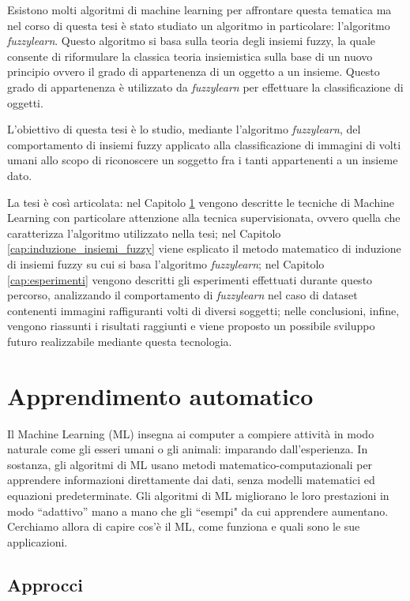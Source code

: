\documentclass[12pt,italian]{report}
\begin{document}
Esistono molti algoritmi di machine learning per affrontare questa tematica ma nel corso di questa tesi è stato studiato un algoritmo in particolare: l'algoritmo \emph{fuzzylearn}. Questo algoritmo si basa sulla teoria degli insiemi fuzzy, la quale consente di riformulare la classica teoria insiemistica sulla base di un nuovo principio ovvero il grado di appartenenza di un oggetto a un insieme. Questo grado di appartenenza è utilizzato da \emph{fuzzylearn} per effettuare la classificazione di oggetti.

L'obiettivo di questa tesi è lo studio, mediante l'algoritmo \emph{fuzzylearn}, del comportamento di insiemi fuzzy applicato alla classificazione di immagini di volti umani allo scopo di riconoscere un soggetto fra i tanti appartenenti a un insieme dato.

La tesi è così articolata: nel Capitolo \ref{cap:apprendimento_automatico} vengono descritte le tecniche di Machine Learning con particolare attenzione alla tecnica supervisionata, ovvero quella che caratterizza l'algoritmo utilizzato nella tesi; nel Capitolo \ref{cap:induzione_insiemi_fuzzy} viene esplicato il metodo matematico di induzione di insiemi fuzzy su cui si basa l'algoritmo \emph{fuzzylearn}; nel Capitolo \ref{cap:esperimenti} vengono descritti gli esperimenti effettuati durante questo percorso, analizzando il comportamento di \emph{fuzzylearn} nel caso di dataset contenenti immagini raffiguranti volti di diversi soggetti; nelle conclusioni, infine, vengono riassunti i risultati raggiunti e viene proposto un possibile sviluppo futuro realizzabile mediante questa tecnologia.
\chapter{Apprendimento automatico}
\label{cap:apprendimento_automatico}
Il Machine Learning (ML) insegna ai computer a compiere attività in modo naturale come gli esseri umani o gli animali: imparando dall’esperienza. In sostanza, gli algoritmi di ML usano metodi matematico-computazionali per apprendere informazioni direttamente dai dati, senza modelli matematici ed equazioni predeterminate. Gli algoritmi di ML migliorano le loro prestazioni in modo ``adattivo” mano a mano che gli ``esempi" da cui apprendere aumentano. Cerchiamo allora di capire cos’è il ML, come funziona e quali sono le sue applicazioni.
\section{Approcci}
\label{sec:approcci}
\end{document}
